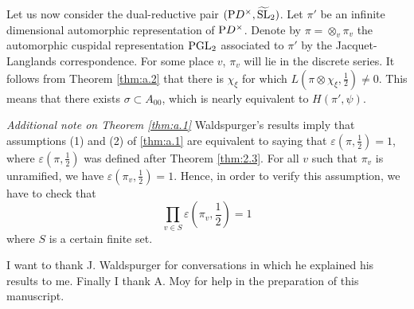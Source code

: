 \begin{appendices}
Let us now consider the dual-reductive pair $(\mathrm{P} D^\times, \widetilde{\mathrm{SL}}_2)$.
Let $\pi'$ be an infinite dimensional automorphic representation of $\mathrm{P} D^\times$.
Denote by $\pi = \otimes_v \pi_v$ the automorphic cuspidal representation $\mathrm{PGL}_2$ associated to $\pi'$ by the Jacquet-Langlands correspondence.
For some place $v$, $\pi_v$ will lie in the discrete series. It follows from Theorem \ref{thm:a.2} that there is $\chi_\xi$ for which $L(\pi \otimes \chi_\xi, \frac{1}{2}) \neq 0$.
This means that there exists $\sigma \subset A_{00}$, which is nearly equivalent to $H(\pi', \psi)$.

\emph{Additional note on Theorem \ref{thm:a.1}}
Waldspurger's results \cite{waldspurger91quaternion} imply that assumptions (1) and (2) of \ref{thm:a.1} are equivalent to saying that $\varepsilon(\pi, \frac{1}{2}) = 1$, where $\varepsilon(\pi, \frac{1}{2})$ was defined after Theorem \ref{thm:2.3}.
For all $v$ such that $\pi_v$ is unramified, we have $\varepsilon(\pi_v, \frac{1}{2}) = 1$.
Hence, in order to verify this assumption, we have to check that
\[
\prod_{v \in S} \varepsilon\left(\pi_v, \frac{1}{2}\right) = 1
\]
where $S$ is a certain finite set.

I want to thank J. Waldspurger for conversations in which he explained his results to me. Finally I thank A. Moy for help in the preparation of this manuscript.
\end{appendices}